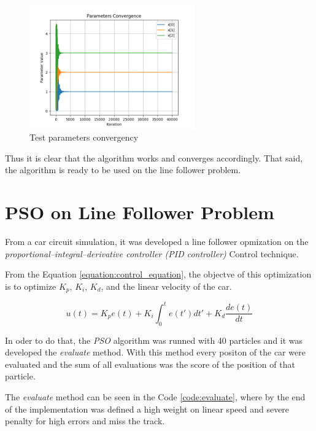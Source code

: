 \begin{figure}
  \begin{center}
  \includegraphics[width=2.8in]{./../code/test_function_result/test_parameters_converge.png}
  \caption{Test parameters convergency}
  \label{img:test_parameters_quality_converge}
  \end{center}
\end{figure}

Thus it is clear that the algorithm works and converges accordingly. That said, the algorithm is ready to be used on the line follower problem.

\section {PSO on Line Follower Problem}

From a car circuit simulation, it was developed a line follower opmization on the \textit{proportional–integral–derivative controller (PID controller)} Control technique.

From the Equation \ref{equation:control_equation}, the objectve of this optimization is to optimize $K_p$, $K_i$, $K_d$, and the linear velocity of the car.

\begin{equation}
    \label{equation:control_equation}
    u(t) =  K_p e(t) + K_i \int_{0}^{t} e(t')dt'+K_d \frac{de(t)}{dt}
\end{equation}

In oder to do that, the \textit{PSO} algorithm was runned with 40 particles and it was developed the \textit{evaluate} method. With this method every positon of the car were evaluated and the sum of all evaluations was the score of the position of that particle.

The \textit{evaluate} method can be seen in the Code \ref{code:evaluate}, where by the end of the implementation was defined a high weight on linear speed and severe penalty for high errors and miss the track.

